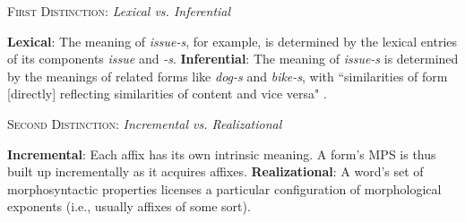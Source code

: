 \begin{exe}
\ex \textsc{First Distinction}: \textit{Lexical vs. Inferential} %
\begin{xlist}
	\ex \textbf{Lexical}: The meaning of \textit{issue-s}, for example, is determined by the lexical entries of its components \textit{issue} and \textit{-s}.
	\ex \textbf{Inferential}: The meaning of \textit{issue-s} is determined by the meanings of related forms like \textit{dog-s} and \textit{bike-s},
with ``similarities of form [directly] reflecting similarities of content and vice versa" \citep[][p. 2]{anderson:2015shorthist}. \label{ex:d-one-b}
	\end{xlist}
\ex \textsc{Second Distinction}: \textit{Incremental vs. Realizational} %
\begin{xlist} 
	\ex \textbf{Incremental}: Each affix has its own intrinsic meaning. 
	A form's \ac{MPS} is thus built up incrementally as it acquires affixes.
	\label{ex:d-two-a}
	\ex \textbf{Realizational}: A word's set of morphosyntactic properties 
	licenses a particular configuration of morphological exponents 
	(i.e., usually affixes of some sort). 
	\end{xlist}
\end{exe}

